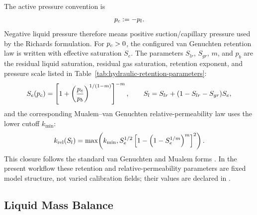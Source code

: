 The active pressure convention is
\begin{equation}
  p_c := -p_l .
  \label{eq:capillary-pressure}
\end{equation}
Negative liquid pressure therefore means positive suction/capillary pressure
used by the Richards formulation.  For \(p_c>0\), the
configured van Genuchten retention law is written with effective saturation \(S_e\).
The parameters \(S_{lr}\), \(S_{gr}\), \(m\), and \(p_b\) are the residual liquid
saturation, residual gas saturation, retention exponent, and pressure scale listed in
Table~\ref{tab:hydraulic-retention-parameters}:
\begin{equation}
  S_e(p_c)
  =
  \left[1+\left(\frac{p_c}{p_b}\right)^{1/(1-m)}\right]^{-m},
  \qquad
  S_l
  =
  S_{lr} + (1-S_{lr}-S_{gr}) S_e ,
  \label{eq:vg-saturation}
\end{equation}
and the corresponding Mualem--van Genuchten relative-permeability law uses the lower
cutoff \(k_{\min}\):
\begin{equation}
  k_{\mathrm{rel}}(S_l)
  =
  \max\!\left(
    k_{\min},
    S_e^{1/2}
    \left[1-\left(1-S_e^{1/m}\right)^m\right]^2
  \right).
  \label{eq:relative-permeability}
\end{equation}
This closure follows the standard van Genuchten and Mualem forms
\citep[p.~892, Eqs.~2--3 and p.~893, Eq.~8]{VanGenuchten1980}
\citep[pp.~513--515, Eqs.~1--2, 14, and 21]{Mualem1976}.  In the present workflow
these retention and relative-permeability parameters are fixed model structure, not
varied calibration fields; their values are declared in
.



\subsection{Liquid Mass Balance}
\label{sec:mass-balance}

